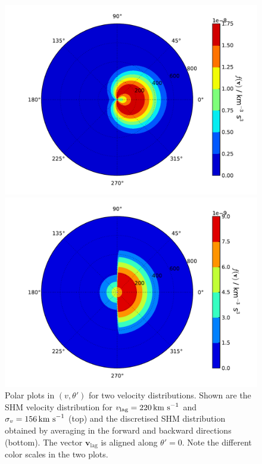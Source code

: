 \begin{figure}[t]
\label{fig:directional:fN2}
  \centering
  \includegraphics[width=1\textwidth]{Directional/SHMpolar.pdf}

  \includegraphics[width=1\textwidth]{Directional/SHMpolarN2.pdf}

\caption[Discretised velocity distribution for $N=2$ components]{Polar plots in $(v,\theta')$ for two velocity distributions. Shown are the SHM velocity distribution for $v_\textrm{lag} = 220 \,\textrm{km s}^{-1}$ and $\sigma_v = 156 \,\textrm{km s}^{-1}$ (top) and the discretised SHM distribution obtained by averaging in the forward and backward directions (bottom). The vector $\textbf{v}_\textrm{lag}$ is aligned along $\theta' = 0$. Note the different color scales in the two plots. }
\end{figure}



